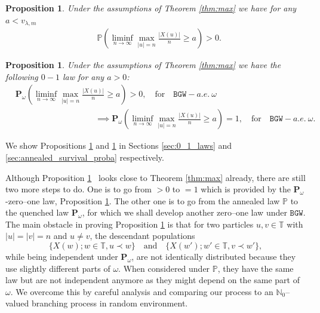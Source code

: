 \documentclass[11 pt]{article}
\newtheorem{proposition}[theorem]{Proposition}
\theoremstyle{definition}
\numberwithin{equation}{section}
\newcommand{\NN}{\mathbb{N}}
\newcommand{\TT}{\mathbb{T}} %
\newcommand{\PP}{\mathbb{P}} %
\newcommand{\Pw}{\mathbf{P}_{\omega}} %
\begin{document}
\begin{proposition}\label{prop:annealed_survival_proba}
	Under the assumptions of Theorem \ref{thm:max} we have for any $a<v_{\lambda,m}$
	\begin{align*}
		&\PP \left( \liminf_{n\to\infty} \max_{\vert u \vert = n} \frac{\vert X(u) \vert}{n} \ge  a\right) > 0.
	\end{align*}
\end{proposition}

\begin{proposition}\label{prop:0-1-law-for-liminf}
	Under the assumptions of Theorem \ref{thm:max} we have the following $0-1$ law for any $a>0$:
	\begin{align*}
		&\Pw\left( \liminf_{n\to\infty} \max_{\vert u \vert = n} \frac{\vert X(u) \vert}{n} \geq a\right) > 0 , \quad \text{for} \quad \mathtt{BGW}-a.e. \ \omega \\
		 & \hspace{4cm} \implies \Pw\left( \liminf_{n\to\infty} \max_{\vert u \vert = n} \frac{\vert X(u) \vert}{n} \geq a\right) =1, \quad \text{for} \quad \mathtt{BGW}-a.e. \ \omega.
	\end{align*}
\end{proposition} 

We show Propositions \ref{prop:0-1-law-for-liminf} and  \ref{prop:annealed_survival_proba} in Sections \ref{sec:0_1_laws} and \ref{sec:annealed_survival_proba} respectively. 

Although Proposition \ref{prop:annealed_survival_proba}~ looks 
close to Theorem \ref{thm:max} already, there are still two more steps to do. One is to go from $>0$ to $=1$ which is provided by the $\Pw$-zero--one law, Proposition \ref{prop:0-1-law-for-liminf}. The other one is to go from the annealed law $\PP$ to the quenched law $\Pw$, for which we shall develop another zero--one law under $\mathtt{BGW}$. The main obstacle in proving Proposition \ref{prop:annealed_survival_proba} is that for two particles $u,v \in \TT$ with $\vert u \vert = \vert v \vert = n$ and $u\neq v$, the descendant populations 
\begin{equation*}
 	\{X(w);w \in \TT,u \prec w \} \quad \text{and} \quad \{X(w');w' \in \TT, v \prec w' \},
\end{equation*}
while being independent under $\Pw$, are not identically distributed because they use slightly different parts of $\omega$. When considered under $\PP$, they have the same law but are not independent anymore as they might depend on the same part of $\omega$. We overcome this by careful analysis and comparing our process to an $\NN_0$--valued branching process in random environment. 
\end{document}
